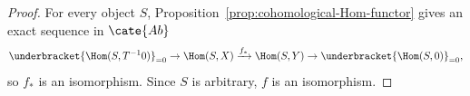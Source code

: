 \begin{proof}
	For every object $S$, Proposition~\ref{prop:cohomological-Hom-functor}
	gives an exact sequence in $\cate{Ab}$
	\[ \underbracket{\Hom(S, T^{-1} 0)}_{= 0} \to \Hom(S, X) \xrightarrow{f_*} \Hom(S, Y) \to \underbracket{\Hom(S, 0)}_{= 0}, \]
	so $f_*$ is an isomorphism. Since $S$ is arbitrary, $f$ is an
	isomorphism.
\end{proof}

